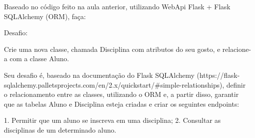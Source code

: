 Baseado no código feito na aula anterior, utilizando WebApi Flask + Flask SQLAlchemy (ORM), faça:

Desafio:

Crie uma nova classe, chamada Disciplina com atributos do seu gosto, e relacione-a com a classe Aluno. 

Seu desafio é, baseado na documentação do Flask SQLAlchemy (https://flask-sqlalchemy.palletsprojects.com/en/2.x/quickstart/#simple-relationships), definir o relacionamento entre as classes, utilizando o ORM e, a partir disso, garantir que as tabelas Aluno e Disciplina esteja criadas e criar os seguintes endpoints:

1. Permitir que um aluno se inscreva em uma disciplina;
2. Consultar as disciplinas de um determinado aluno.